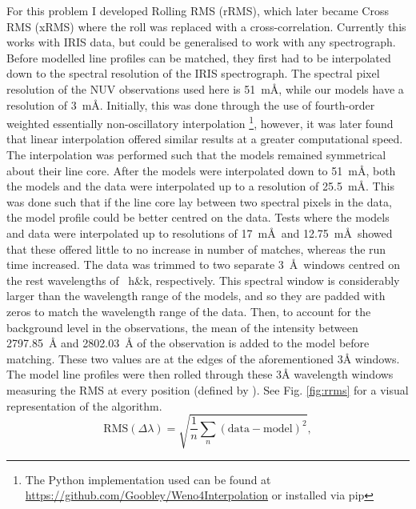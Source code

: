 For this problem I developed Rolling RMS (rRMS), which later became Cross RMS (xRMS) where the roll was replaced with a cross-correlation. Currently this works with IRIS data, but could be generalised to work with any spectrograph. Before modelled line profiles can be matched, they first had to be interpolated down to the spectral resolution of the IRIS spectrograph. The spectral pixel resolution of the NUV observations used here is 51~m\AA, while our models have a resolution of 3~m\AA. Initially, this was done through the use of fourth-order weighted essentially non-oscillatory interpolation \citep[WENO4; ][]{janett_novel_2019}\footnote{The Python implementation used can be found at \href{https://github.com/Goobley/Weno4Interpolation}{https://github.com/Goobley/Weno4Interpolation} or installed via pip}, however, it was later found that linear interpolation offered similar results at a greater computational speed. The interpolation was performed such that the models remained symmetrical about their line core. After the models were interpolated down to 51~m\AA, both the models and the data were interpolated up to a resolution of 25.5~m\AA. This was done such that if the line core lay between two spectral pixels in the data, the model profile could be better centred on the data. Tests where the models and data were interpolated up to resolutions of 17~m\AA\ and 12.75~m\AA\ showed that these offered little to no increase in number of matches, whereas the run time increased. The data was trimmed to two separate 3~\AA\ windows centred on the rest wavelengths of \mgii~h\&k, respectively. This spectral window is considerably larger than the wavelength range of the models, and so they are padded with zeros to match the wavelength range of the data. Then, to account for the background level in the observations, the mean of the intensity between 2797.85~\AA{} and 2802.03~\AA{} of the observation is added to the model before matching. These two values are at the edges of the aforementioned 3\AA{} windows. The model line profiles were then rolled through these 3\AA{} wavelength windows measuring the RMS at every position (defined by ). See Fig. \ref{fig:rrms} for a visual representation of the algorithm.
\begin{equation}
    \text{RMS}(\Delta\lambda)=\sqrt{\frac{1}{n}\sum_n\left(\text{data}-\text{model}\right)^2},
    \label{rmseq}
\end{equation}
